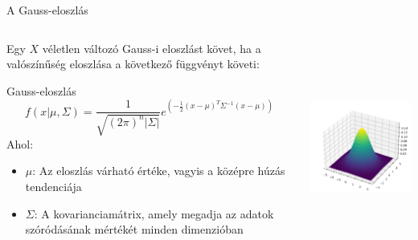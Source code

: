 \documentclass[english, aspectratio=169]{beamer}
\begin{document}
\begin{frame}{A Gauss-eloszlás}
\begin{columns}
\begin{column}{.6\textwidth}
Egy $X$ véletlen változó Gauss-i eloszlást követ, ha a valószínűség eloszlása a következő függvényt követi:
\begin{block}{Gauss-eloszlás}
\vspace{-.3cm}
\[
f(x \vert \mu, \Sigma) = \frac{1}{\sqrt{(2\pi)^n \vert \Sigma \vert}} e^{\left(-\frac{1}{2}(x - \mu)^T \Sigma^{-1} (x - \mu)\right)}
\]
Ahol:
\begin{itemize}
	\item $\mu$: Az eloszlás várható értéke, vagyis a középre húzás tendenciája
	\item $\Sigma$: A kovarianciamátrix, amely megadja az adatok szóródásának mértékét minden dimenzióban
\end{itemize}
\end{block}
\end{column}
\begin{column}{.4\textwidth}
\begin{center}
\includegraphics[width=6cm, height=7cm, keepaspectratio]{images/generative_10.png}
\end{center}
\end{column}
\end{columns}
\end{frame}
\end{document}
